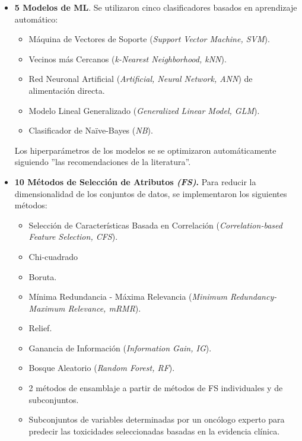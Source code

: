 \begin{itemize}
    \item \textbf{5 Modelos de ML}. Se utilizaron cinco clasificadores basados en aprendizaje 
    automático: 
    \begin{itemize}[label={--}]
        \item Máquina de Vectores de Soporte (\textit{Support Vector Machine, SVM}).
        \item Vecinos más Cercanos (\textit{k-Nearest Neighborhood, kNN}).
        \item Red Neuronal Artificial (\textit{Artificial, Neural Network, ANN}) de alimentación directa.
        \item Modelo Lineal Generalizado (\textit{Generalized Linear Model, GLM}).
        \item Clasificador de Naïve-Bayes (\textit{NB}).
    \end{itemize}
     Los hiperparámetros de los modelos se se optimizaron automáticamente siguiendo ''las recomendaciones de la literatura''.
    
    \item \textbf{10 Métodos de Selección de Atributos \textit{(FS)}.} Para reducir la dimensionalidad de los conjuntos de datos, se implementaron los siguientes métodos:
    
    \begin{itemize}[label={--}]
        \item Selección de Características Basada en Correlación (\textit{Correlation-based Feature Selection, CFS}).
        \item Chi-cuadrado %
        \item Boruta.
        \item Mínima Redundancia - Máxima Relevancia (\textit{Minimum Redundancy-Maximum Relevance, mRMR}).
        \item Relief.
        \item Ganancia de Información (\textit{Information Gain, IG}).
        \item  Bosque Aleatorio (\textit{Random Forest, RF}).
        \item 2 métodos de ensamblaje a partir de métodos de FS individuales y de subconjuntos.
        \item Subconjuntos de variables determinadas por un oncólogo experto para predecir las toxicidades seleccionadas basadas en la evidencia clínica.
    \end{itemize}


\end{itemize}
